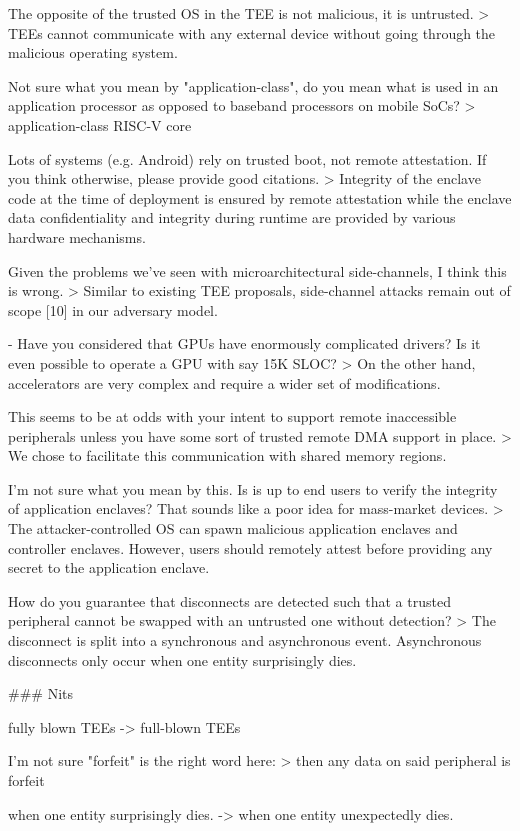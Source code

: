 The opposite of the trusted OS in the TEE is not  malicious, it is untrusted.
> TEEs cannot communicate with any external device without going through the malicious operating system.

Not sure what you mean by "application-class", do you mean what is used in an application processor as opposed to baseband processors on mobile SoCs?
> application-class RISC-V core

Lots of systems (e.g. Android) rely on trusted boot, not remote attestation. If you think otherwise, please provide good citations. 
> Integrity of the enclave code at the time of deployment is ensured by remote attestation while the enclave data conﬁdentiality and integrity during runtime are provided by various hardware mechanisms.

Given the problems we've seen with microarchitectural side-channels, I think this is wrong.
> Similar to existing TEE proposals, side-channel attacks remain out of scope [10] in our adversary model.

- Have you considered that GPUs have enormously complicated drivers? Is it even possible to operate a GPU with say 15K SLOC?
> On the other hand, accelerators are very complex and require a wider set of modiﬁcations.

This seems to be at odds with your intent to support remote inaccessible peripherals unless you have some sort of trusted remote DMA support in place.
> We chose to facilitate this communication with shared memory regions.


I'm not sure what you mean by this. Is is up to end users to verify the integrity of application enclaves? That sounds like a poor idea for mass-market devices.
> The attacker-controlled OS can spawn malicious application enclaves and controller enclaves. However, users should remotely attest before providing any secret to the application enclave.

How do you guarantee that disconnects are detected such that a trusted peripheral cannot be swapped with an untrusted one without detection?
> The disconnect is split into a synchronous and asynchronous event. Asynchronous disconnects only occur when one entity surprisingly dies.

### Nits

fully blown TEEs -> full-blown TEEs

I'm not sure "forfeit" is the right word here:
> then any data on said peripheral is forfeit

when one entity surprisingly dies. -> when one entity unexpectedly dies.

